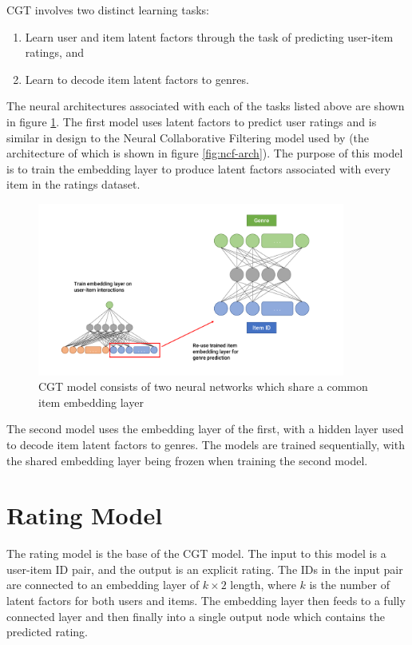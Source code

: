 CGT involves two distinct learning tasks:
\begin{enumerate}
    \item Learn user and item latent factors through the task of predicting user-item ratings, and
    \item Learn to decode item latent factors to genres.
\end{enumerate}
The neural architectures associated with each of the tasks listed above are shown in figure \ref{fig:4_CGT-architecture}. The first model uses latent factors to predict user ratings and is similar in design to the Neural Collaborative Filtering model used by \citeauthor{he2017neural} (the architecture of which is shown in figure \ref{fig:ncf-arch}). The purpose of this model is to train the embedding layer to produce latent factors associated with every item in the ratings dataset.

\begin{figure}[H]
\centering
\includegraphics[width=0.9\textwidth]{Figures/4_CGT-model.pdf}
\decoRule
\caption[CGT architecture]{CGT model consists of two neural networks which share a common item embedding layer}
\label{fig:4_CGT-architecture}
\end{figure}

The second model uses the embedding layer of the first, with a hidden layer used to decode item latent factors to genres. The models are trained sequentially, with the shared embedding layer being frozen when training the second model.

\section{Rating Model}
\label{section:rating-model}
The rating model is the base of the CGT model. The input to this model is a user-item ID pair, and the output is an explicit rating. The IDs in the input pair are connected to an embedding layer of $k\times2$ length, where $k$ is the number of latent factors for both users and items. The embedding layer then feeds to a fully connected layer and then finally into a single output node which contains the predicted rating.

